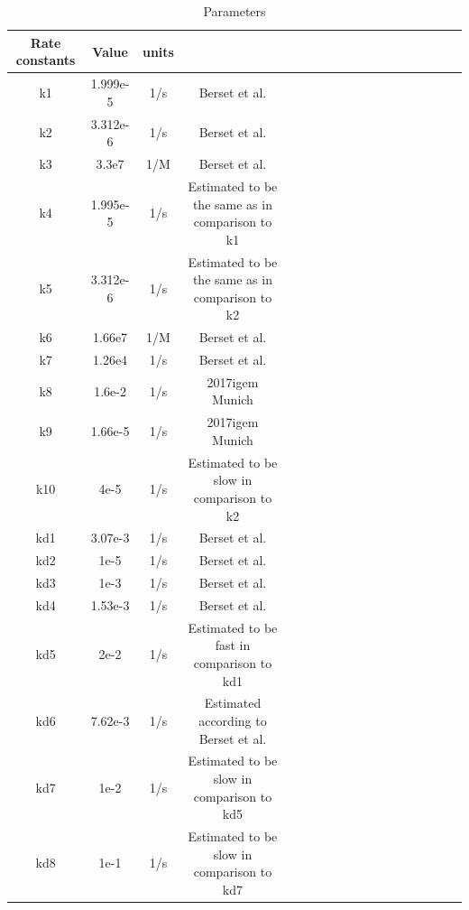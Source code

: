 \\\\
\begin{table}[htbp]
	\centering
	\caption{\label {tab:test} Parameters}
	\begin{tabular}{cccccccccccccccccc}
		\toprule
		Rate constants & Value& units \\
		\midrule
		k1 & 1.999e-5 &1/s & Berset et al. \\
	k2 & 3.312e-6 &1/s & Berset et al.\\
	k3 & 3.3e7    & 1/M &Berset et al.   \\
	k4 &1.995e-5 &1/s & Estimated to be the same as in comparison to k1\\
	k5 & 3.312e-6 &1/s&Estimated to be the same as in comparison to k2\\
	k6 &1.66e7   &1/M & Berset et al.  \\
	k7  &1.26e4 &1/s & Berset et al. \\
	k8&1.6e-2& 1/s & 2017igem Munich\\
	k9 &1.66e-5&1/s&  2017igem Munich\\ 
	k10&4e-5&1/s & Estimated to be slow in comparison to k2 \\
	kd1 & 3.07e-3&1/s & Berset et al.\\
	kd2&1e-5&1/s & Berset et al.\\
	kd3&1e-3&1/s  & Berset et al.\\
	kd4&1.53e-3&1/s  & Berset et al.\\
	kd5 & 2e-2&1/s & Estimated to be fast in comparison to kd1\\
	kd6&7.62e-3&1/s&  Estimated according to Berset et al.\\
	kd7& 1e-2&1/s&  Estimated to be slow in comparison to kd5\\
	kd8&1e-1&1/s&  Estimated to be slow in comparison to kd7\\			
		\bottomrule
	\end{tabular}
\end{table}



